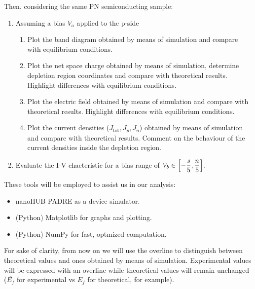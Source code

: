 \documentclass{book}
\begin{document}
            \vspace{10pt}
            Then, considering the same PN semiconducting sample:
            \begin{enumerate}[label=(QB\arabic*), leftmargin=1.5cm]
                \item Assuming a bias $V_{a}$ applied to the p-side
                \begin{enumerate}[label=(QB1.\arabic*)]
                    \item Plot the band diagram obtained by means of simulation and compare with equilibrium conditions.
                    \item Plot the net space charge obtained by means of simulation, determine depletion region coordinates and compare with theoretical results. Highlight differences with equilibrium conditions.
                    \item Plot the electric field obtained by means of simulation and compare with theoretical results. Highlight differences with equilibrium conditions.
                    \item Plot the current densities ($J_{\text{tot}}, J_{p}, J_{n}$) obtained by means of simulation and compare with theoretical results. Comment on the behaviour of the current densities inside the depletion region.
                \end{enumerate}
                \item Evaluate the I-V chacteristic for a bias range of $V_{b} \in \displaystyle \qty[ -\frac{s}{5}, \frac{n}{5} ]$.
            \end{enumerate}

            \vspace{10pt}
            These tools will be employed to assist us in our analysis: 
            \begin{itemize}
                \item nanoHUB PADRE as a device simulator.
                \item (Python) Matplotlib for graphs and plotting.
                \item (Python) NumPy for fast, optmized computation.
            \end{itemize}

            \vspace{10pt}
            For sake of clarity, from now on we will use the overline to distinguish between theoretical values and ones obtained by means of simulation.
            Experimental values will be expressed with an overline while theoretical values will remain unchanged ($\overline{E_{f}}$ for experimental vs $E_{f}$ for theoretical, for example).
\end{document}
